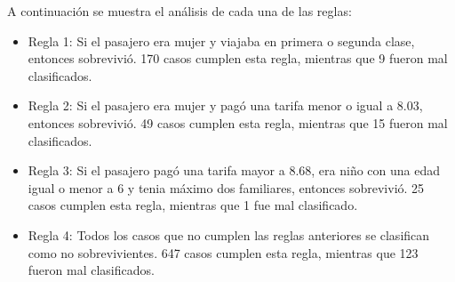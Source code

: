 \documentclass[letterpaper,11pt,spanish]{report}
\begin{document}
A continuaci\'on se muestra el an\'alisis de cada una de las reglas:
\begin{itemize}
  \item Regla 1: Si el pasajero era mujer y viajaba en primera o segunda clase, entonces sobrevivi\'o. 170 casos cumplen esta regla, mientras que 9 fueron mal clasificados.
  \item Regla 2: Si el pasajero era mujer y pag\'o una tarifa menor o igual a 8.03, entonces sobrevivi\'o. 49 casos cumplen esta regla, mientras que 15 fueron mal clasificados.
  \item Regla 3: Si el pasajero pag\'o una tarifa mayor a 8.68, era niño con una edad igual o menor a 6 y tenia m\'aximo dos familiares, entonces sobrevivi\'o. 25 casos cumplen esta regla, mientras que 1 fue mal clasificado.
  \item Regla 4: Todos los casos que no cumplen las reglas anteriores se clasifican como no sobrevivientes. 647 casos cumplen esta regla, mientras que 123 fueron mal clasificados. 
\end{itemize}
\end{document}
